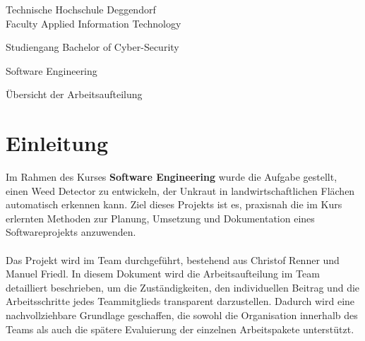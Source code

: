 \documentclass[12pt]{scrartcl}
\newcommand{\faculty}{Faculty Applied Information Technology}
\newcommand{\studies}{Bachelor of Cyber-Security}
\newcommand{\thesistitleDE}{Software Engineering}
\newcommand{\thesistitleEN}{Übersicht der Arbeitsaufteilung}
\begin{document}
\begin{titlepage}
\begin{center}
    {%
    Technische Hochschule Deggendorf\\
    \faculty\par}
    \vspace{.2cm}
    
    {\Large Studiengang \studies\\}
    \vspace{2\baselineskip}
    
    {\Huge{}\thesistitleDE\par}
    \vspace{1cm}
    {\Huge{}\thesistitleEN\par}
    \vspace{3\baselineskip}
    
\end{center}
\end{titlepage}
\cleardoublepage
\tableofcontents
\newpage
\section{Einleitung}
Im Rahmen des Kurses \textbf{Software Engineering} wurde die Aufgabe gestellt, einen Weed Detector zu entwickeln, der Unkraut in landwirtschaftlichen Flächen automatisch erkennen kann. Ziel dieses Projekts ist es, praxisnah die im Kurs erlernten Methoden zur Planung, Umsetzung und Dokumentation eines Softwareprojekts anzuwenden.\\
\\
Das Projekt wird im Team durchgeführt, bestehend aus Christof Renner und Manuel Friedl. In diesem Dokument wird die Arbeitsaufteilung im Team detailliert beschrieben, um die Zuständigkeiten, den individuellen Beitrag und die Arbeitsschritte jedes Teammitglieds transparent darzustellen. Dadurch wird eine nachvollziehbare Grundlage geschaffen, die sowohl die Organisation innerhalb des Teams als auch die spätere Evaluierung der einzelnen Arbeitspakete unterstützt.
\end{document}
